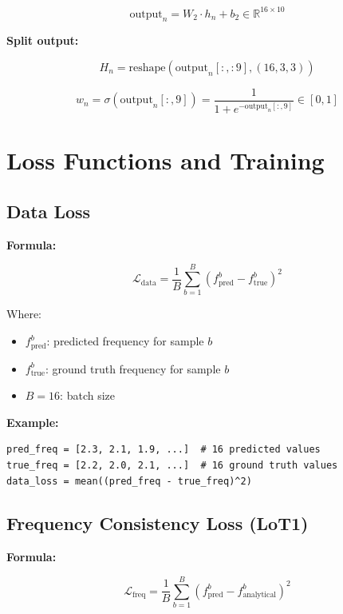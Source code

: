 \documentclass[11pt,a4paper]{article}
\begin{document}
\begin{equation}
\text{output}_n = W_2 \cdot h_n + b_2 \in \mathbb{R}^{16 \times 10}
\end{equation}

\textbf{Split output:}

\begin{equation}
H_n = \text{reshape}(\text{output}_n[:, :9], (16, 3, 3))
\end{equation}

\begin{equation}
w_n = \sigma(\text{output}_n[:, 9]) = \frac{1}{1 + e^{-\text{output}_n[:, 9]}} \in [0, 1]
\end{equation}

\section{Loss Functions and Training}

\subsection{Data Loss}

\textbf{Formula:}

\begin{equation}
\mathcal{L}_{\text{data}} = \frac{1}{B}\sum_{b=1}^{B} (f_{\text{pred}}^b - f_{\text{true}}^b)^2
\end{equation}

Where:
\begin{itemize}
  \item $f_{\text{pred}}^b$: predicted frequency for sample $b$
  \item $f_{\text{true}}^b$: ground truth frequency for sample $b$
  \item $B = 16$: batch size
\end{itemize}

\textbf{Example:}
\begin{lstlisting}
pred_freq = [2.3, 2.1, 1.9, ...]  # 16 predicted values
true_freq = [2.2, 2.0, 2.1, ...]  # 16 ground truth values
data_loss = mean((pred_freq - true_freq)^2)
\end{lstlisting}

\subsection{Frequency Consistency Loss (LoT1)}

\textbf{Formula:}

\begin{equation}
\mathcal{L}_{\text{freq}} = \frac{1}{B}\sum_{b=1}^{B} (f_{\text{pred}}^b - f_{\text{analytical}}^b)^2
\end{equation}
\end{document}
